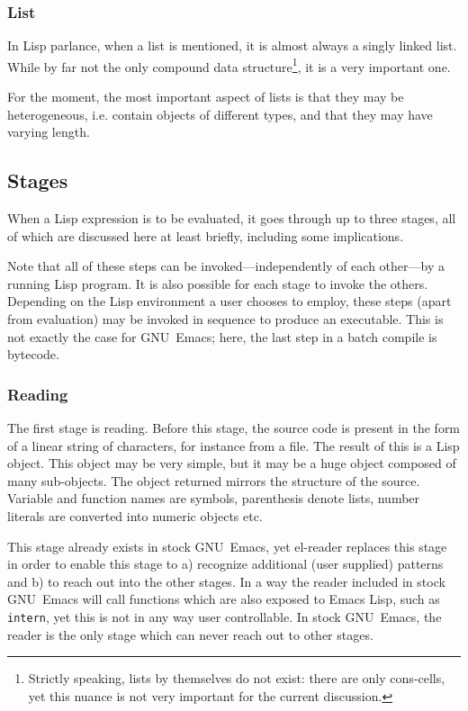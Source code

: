 \documentclass[a4paper,10pt,twoside]{report}
\newcommand{\el}{Emacs Lisp}
\newcommand{\elr}{el-reader}
\newcommand{\fun}[1]{\texttt{#1}}
\newcommand{\emacs}{GNU~Emacs}
\begin{document}
\subsubsection{List}
\label{subsubsec:list}

In Lisp parlance, when a list is mentioned, it is almost always a singly linked
list.  While by far not the only compound data structure\footnote{Strictly
  speaking, lists by themselves do not exist: there are only cons-cells, yet
  this nuance is not very important for the current discussion.}, it is a very
important one.

For the moment, the most important aspect of lists is that they may be
heterogeneous, i.e. contain objects of different types, and that they may have
varying length.

\subsection{Stages}
\label{subsec:stages}

When a Lisp expression is to be evaluated, it goes through up to three stages,
all of which are discussed here at least briefly, including some implications.

Note that all of these steps can be invoked---independently of each other---by a
running Lisp program.  It is also possible for each stage to invoke the others.
Depending on the Lisp environment a user chooses to
employ, these steps (apart from evaluation) may be invoked in sequence to
produce an executable.  This is not exactly the case for \emacs{}; here, the
last step in a batch compile is bytecode.

\subsubsection{Reading}
\label{subsubsec:reading}

The first stage is reading.  Before this stage, the source code is present in
the form of a linear string of characters, for instance from a file.  The result
of this is a Lisp object.  This object may be very simple, but it may be a huge
object composed of many sub-objects.  The object returned mirrors the structure
of the source.  Variable and function names are symbols, parenthesis denote
lists, number literals are converted into numeric objects etc.

This stage already exists in stock \emacs{}, yet \elr{} replaces this stage in
order to enable this stage to a) recognize additional (user supplied) patterns
and b) to reach out into the other stages.  In a way the reader included in
stock \emacs{} will call functions which are also exposed to \el{}, such as
\fun{intern}, yet this is not in any way user controllable.  In stock \emacs{},
the reader is the only stage which can never reach out to other stages.
\end{document}
